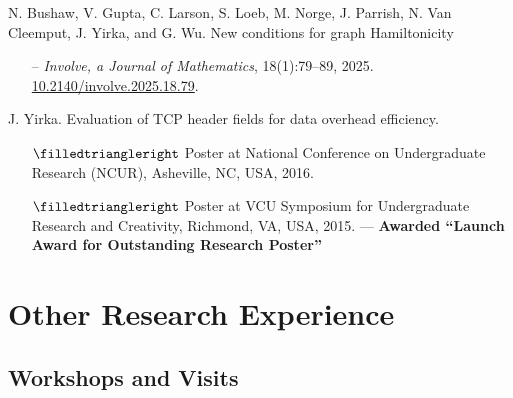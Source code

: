 \documentclass[11pt,letterpaper,serif]{moderncv}
\newcommand{\pubItemSep}{0em}
\begin{document}
N. Bushaw, V. Gupta, C. Larson, S. Loeb, M. Norge, J. Parrish, N. Van Cleemput, J. Yirka, and G. Wu.\quad
New conditions for graph Hamiltonicity
\begin{adjustwidth}{.1in}{}
	\begin{itemize}[itemsep=\pubItemSep]
		\item[--] \textit{Involve, a Journal of Mathematics}, 18(1):79--89, 2025.\quad
		\href{https://doi.org/10.2140/involve.2025.18.79}{10.2140/involve.2025.18.79}.
	\end{itemize}
\end{adjustwidth}
\medskip

J. Yirka.\quad
Evaluation of TCP header fields for data overhead efficiency.
\begin{adjustwidth}{.1in}{}
	\begin{itemize}[itemsep=\pubItemSep]
		\item[$\filledtriangleright$] Poster at National Conference on Undergraduate Research (NCUR), Asheville, NC, USA, 2016.
		\item[$\filledtriangleright$] Poster at VCU Symposium for Undergraduate Research and Creativity, Richmond, VA, USA, 2015. --- \textbf{Awarded ``Launch Award for Outstanding Research Poster''}
	\end{itemize}
\end{adjustwidth}


\section{Other Research Experience}
\subsection{Workshops and Visits}


{}

\end{document}
